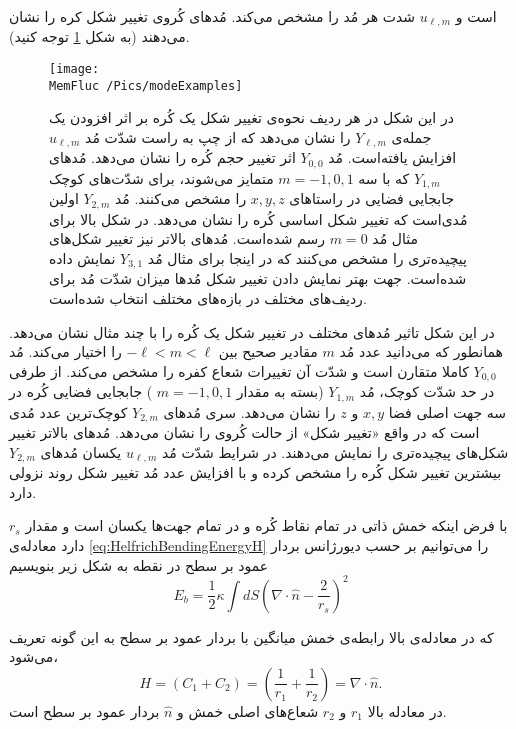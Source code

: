 است و 
$u_{\ell,m}$
شدت هر مُد را مشخص می‌کند. مُد‌های کُروی تغییر شکل کره را نشان می‌دهند (به شکل 
\ref{fig:ulmExamples}
توجه کنید).
\begin{figure}[h]
\begin{center}
\texttt{[image: \\MemFluc /Pics/modeExamples]}
\caption{
در این شکل در هر ردیف نحوه‌ی تغییر شکل یک کُره بر اثر افزودن یک جمله‌ی 
$Y_{\ell,m}$
را نشان می‌دهد که از چپ به راست شدّت مُد
$u_{\ell,m}$
افزایش یافته‌است. مُد‌ 
$Y_{0,0}$
اثر تغییر حجم کُره را نشان می‌دهد. مُد‌های 
$Y_{1,m}$
که با سه 
$m=-1,0,1$
متمایز می‌شوند، برای شدّت‌های کوچک جابجایی فضایی در راستا‌های 
$x,y,z$
را مشخص می‌کنند. مُد
$Y_{2,m}$
اولین مُدی‌است که تغییر شکل اساسی کُره را نشان می‌دهد. در شکل بالا برای مثال مُد
$m=0$
رسم شده‌است. مُدهای بالاتر نیز تغییر شکل‌های پیچیده‌تری را مشخص می‌کنند که در اینجا برای مثال مُد 
$Y_{3,1}$
نمایش داده شده‌است. جهت بهتر نمایش دادن تغییر شکل مُدها میزان شدّت مُد برای ردیف‌های مختلف در بازه‌های مختلف انتخاب شده‌است.
}
\label{fig:ulmExamples}
\end{center}
\end{figure}

در این شکل تاثیر مُدهای مختلف در تغییر شکل یک کُره را با چند مثال نشان می‌دهد. همانطور که می‌دانید عدد مُد 
$m$
مقادیر صحیح بین 
$-\ell<m<\ell$
را اختیار می‌کند.  مُد
$Y_{0,0}$
کاملا متقارن است و شدّت آن تغییرات شعاع کفره را مشخص می‌کند. از طرفی در حد شدّت کوچک، مُد 
$Y_{1,m}$
(بسته به مقدار 
$m=-1,0,1$
) جابجایی فضایی کُره در سه جهت اصلی فضا 
$x,y$
و
$z$
را نشان می‌دهد. سری مُدهای 
$Y_{2,m}$
کوچک‌ترین عدد مُدی است که در واقع «تغییر شکل» از حالت کُروی را نشان می‌دهد. مُدهای بالاتر تغییر شکل‌های پیچیده‌تری را نمایش می‌دهند. در شرایط شدّت مُد
$u_{\ell,m}$
یکسان مُدهای
$Y_{2,m}$
بیشترین تغییر شکل کُره را مشخص کرده و با افزایش عدد مُد تغییر شکل روند نزولی دارد.


با فرض اینکه خمش ذاتی در تمام نقاط کُره و در تمام جهت‌ها یکسان است و مقدار 
$r_s$
دارد معادله‌ی
\ref{eq:HelfrichBendingEnergyH}
را می‌توانیم بر حسب دیورژانس بردار عمود بر سطح در نقطه به شکل زیر بنویسیم
\cite{safran1983}
\begin{equation}
E_{b}=\frac{1}{2}\kappa\int dS\left(\nabla\cdot\hat n-\frac{2}{r_s}\right)^2
\label{eq:ebforsubstitution}
\end{equation}

که در معادله‌ی بالا رابطه‌ی خمش میانگین با بردار عمود بر سطح به این گونه تعریف می‌شود،
\begin{equation}
H=(C_1+C_2)=\left(\frac{1}{r_1}+\frac{1}{r_2}\right)=\nabla\cdot\hat n.
\end{equation}
‌ در معادله بالا
$r_1$ و $r_2$
شعاع‌های اصلی خمش
و $\hat n$ بردار عمود بر سطح است.

